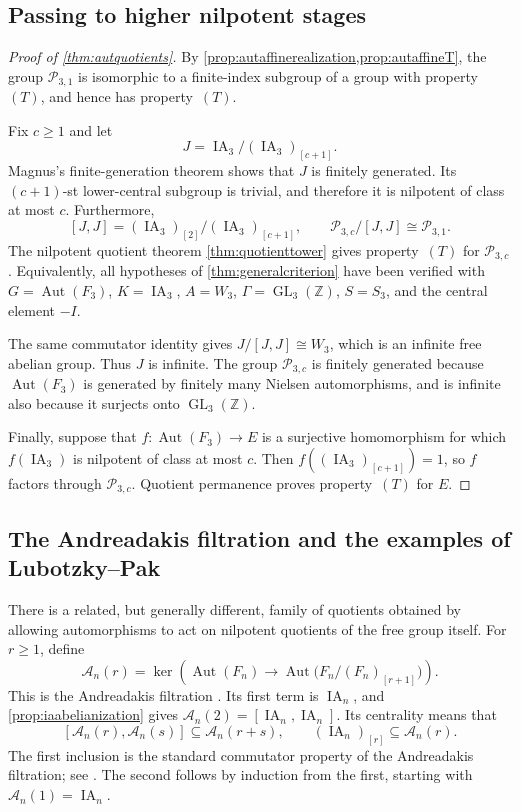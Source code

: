 \documentclass[11pt,a4paper]{article}
\theoremstyle{definition}
\newcommand{\Z}{\mathbb Z}
\newcommand{\GL}{\operatorname{GL}}
\newcommand{\Aut}{\operatorname{Aut}}
\newcommand{\rt}{(T)}
\begin{document}
\subsection{Passing to higher nilpotent stages}

\begin{proof}[Proof of \cref{thm:autquotients}]
By \cref{prop:autaffinerealization,prop:autaffineT}, the group
\(\mathcal{P}_{3,1}\) is isomorphic to a finite-index
subgroup of a group with property~\(\rt\), and hence has
property~\(\rt\).

Fix \(c\ge1\) and let \[J=\operatorname{IA}_3/
(\operatorname{IA}_3)_{[c+1]}.\] Magnus's finite-generation
theorem \cite[Section~6]{Magnus1935} shows that \(J\) is finitely generated. Its
\((c+1)\)-st lower-central subgroup is trivial, and therefore
it is nilpotent of class at most \(c\). Furthermore,
\[
 [J,J]=(\operatorname{IA}_3)_{[2]}/
                (\operatorname{IA}_3)_{[c+1]},
 \qquad
 \mathcal{P}_{3,c}/[J,J]\cong\mathcal{P}_{3,1}.
\]
The nilpotent quotient theorem \cref{thm:quotienttower} gives
property~\(\rt\) for \(\mathcal{P}_{3,c}\). Equivalently,
all hypotheses of \cref{thm:generalcriterion} have been
verified with \(G=\Aut(F_3)\), \(K=\operatorname{IA}_3\),
\(A=W_3\), \(\Gamma=\GL_3(\Z)\), \(S=S_3\), and the
central element \(-I\).

The same commutator identity gives
\(J/[J,J]\cong W_3\), which is an infinite free abelian
group. Thus \(J\) is infinite. The group
\(\mathcal{P}_{3,c}\) is finitely generated because
\(\Aut(F_3)\) is generated by finitely many Nielsen
automorphisms, and is infinite also because it surjects onto
\(\GL_3(\Z)\).

Finally, suppose that \(f:\Aut(F_3)\to E\) is a surjective
homomorphism for which \(f(\operatorname{IA}_3)\) is nilpotent
of class at most \(c\). Then
\(f((\operatorname{IA}_3)_{[c+1]})=1\), so \(f\) factors
through \(\mathcal{P}_{3,c}\). Quotient permanence proves
property~\(\rt\) for \(E\).
\end{proof}

\subsection{The Andreadakis filtration and the examples of
Lubotzky--Pak}

There is a related, but generally different, family of quotients
obtained by allowing automorphisms to act on nilpotent quotients
of the free group itself. For \(r\ge1\), define
\[
 \mathcal A_n(r)=\ker\!\left(
 \Aut(F_n)\longrightarrow
 \Aut\bigl(F_n/(F_n)_{[r+1]}\bigr)\right).
\]
This is the Andreadakis filtration \cite{Andreadakis}. Its first term is
\(\operatorname{IA}_n\), and
\cref{prop:iaabelianization} gives
\(\mathcal A_n(2)=[\operatorname{IA}_n,\operatorname{IA}_n]\).
Its centrality means that
\[
 [\mathcal A_n(r),\mathcal A_n(s)]
      \subseteq\mathcal A_n(r+s),
 \qquad
 (\operatorname{IA}_n)_{[r]}\subseteq\mathcal A_n(r).
\]
The first inclusion is the standard commutator property of the
Andreadakis filtration; see \cite[Section~3.2]{SatohSurvey}.
The second follows by induction from the first, starting with
\(\mathcal A_n(1)=\operatorname{IA}_n\).
\end{document}
